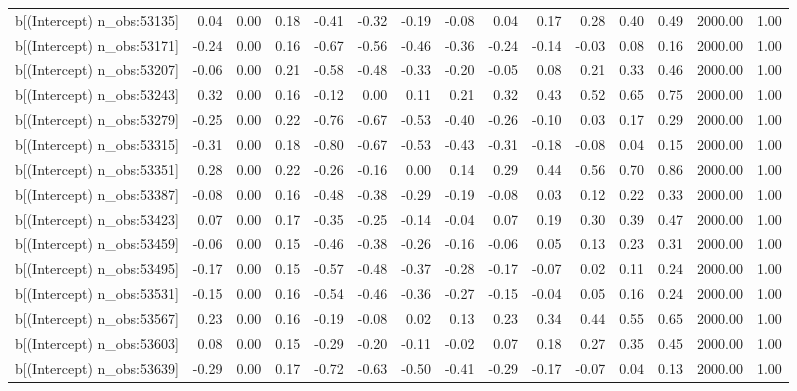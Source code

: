 \begin{table}[ht]
\begin{tabular}{rrrrrrrrrrrrrrr}
  b[(Intercept) n\_obs:53135] & 0.04 & 0.00 & 0.18 & -0.41 & -0.32 & -0.19 & -0.08 & 0.04 & 0.17 & 0.28 & 0.40 & 0.49 & 2000.00 & 1.00 \\ 
  b[(Intercept) n\_obs:53171] & -0.24 & 0.00 & 0.16 & -0.67 & -0.56 & -0.46 & -0.36 & -0.24 & -0.14 & -0.03 & 0.08 & 0.16 & 2000.00 & 1.00 \\ 
  b[(Intercept) n\_obs:53207] & -0.06 & 0.00 & 0.21 & -0.58 & -0.48 & -0.33 & -0.20 & -0.05 & 0.08 & 0.21 & 0.33 & 0.46 & 2000.00 & 1.00 \\ 
  b[(Intercept) n\_obs:53243] & 0.32 & 0.00 & 0.16 & -0.12 & 0.00 & 0.11 & 0.21 & 0.32 & 0.43 & 0.52 & 0.65 & 0.75 & 2000.00 & 1.00 \\ 
  b[(Intercept) n\_obs:53279] & -0.25 & 0.00 & 0.22 & -0.76 & -0.67 & -0.53 & -0.40 & -0.26 & -0.10 & 0.03 & 0.17 & 0.29 & 2000.00 & 1.00 \\ 
  b[(Intercept) n\_obs:53315] & -0.31 & 0.00 & 0.18 & -0.80 & -0.67 & -0.53 & -0.43 & -0.31 & -0.18 & -0.08 & 0.04 & 0.15 & 2000.00 & 1.00 \\ 
  b[(Intercept) n\_obs:53351] & 0.28 & 0.00 & 0.22 & -0.26 & -0.16 & 0.00 & 0.14 & 0.29 & 0.44 & 0.56 & 0.70 & 0.86 & 2000.00 & 1.00 \\ 
  b[(Intercept) n\_obs:53387] & -0.08 & 0.00 & 0.16 & -0.48 & -0.38 & -0.29 & -0.19 & -0.08 & 0.03 & 0.12 & 0.22 & 0.33 & 2000.00 & 1.00 \\ 
  b[(Intercept) n\_obs:53423] & 0.07 & 0.00 & 0.17 & -0.35 & -0.25 & -0.14 & -0.04 & 0.07 & 0.19 & 0.30 & 0.39 & 0.47 & 2000.00 & 1.00 \\ 
  b[(Intercept) n\_obs:53459] & -0.06 & 0.00 & 0.15 & -0.46 & -0.38 & -0.26 & -0.16 & -0.06 & 0.05 & 0.13 & 0.23 & 0.31 & 2000.00 & 1.00 \\ 
  b[(Intercept) n\_obs:53495] & -0.17 & 0.00 & 0.15 & -0.57 & -0.48 & -0.37 & -0.28 & -0.17 & -0.07 & 0.02 & 0.11 & 0.24 & 2000.00 & 1.00 \\ 
  b[(Intercept) n\_obs:53531] & -0.15 & 0.00 & 0.16 & -0.54 & -0.46 & -0.36 & -0.27 & -0.15 & -0.04 & 0.05 & 0.16 & 0.24 & 2000.00 & 1.00 \\ 
  b[(Intercept) n\_obs:53567] & 0.23 & 0.00 & 0.16 & -0.19 & -0.08 & 0.02 & 0.13 & 0.23 & 0.34 & 0.44 & 0.55 & 0.65 & 2000.00 & 1.00 \\ 
  b[(Intercept) n\_obs:53603] & 0.08 & 0.00 & 0.15 & -0.29 & -0.20 & -0.11 & -0.02 & 0.07 & 0.18 & 0.27 & 0.35 & 0.45 & 2000.00 & 1.00 \\ 
  b[(Intercept) n\_obs:53639] & -0.29 & 0.00 & 0.17 & -0.72 & -0.63 & -0.50 & -0.41 & -0.29 & -0.17 & -0.07 & 0.04 & 0.13 & 2000.00 & 1.00 \\ 

\end{tabular}
\end{table}
